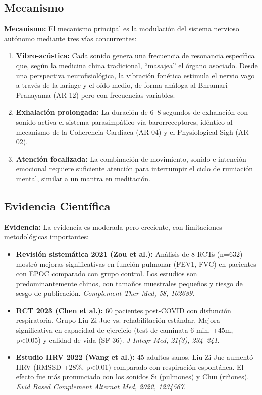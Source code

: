\documentclass[12pt,a4paper]{article}
\newcommand{\mecanismo}[1]{\textbf{Mecanismo:} #1}
\newcommand{\evidencia}[1]{\textbf{Evidencia:} #1}
\begin{document}
\subsection{Mecanismo}

\mecanismo{El mecanismo principal es la modulación del sistema nervioso
autónomo mediante tres vías concurrentes:}

\begin{enumerate}
    \item \textbf{Vibro-acústica:} Cada sonido genera una frecuencia
          de resonancia específica que, según la medicina china tradicional,
          ``masajea'' el órgano asociado. Desde una perspectiva neurofisiológica,
          la vibración fonética estimula el nervio vago a través de la
          laringe y el oído medio, de forma análoga al Bhramari Pranayama
          (AR-12) pero con frecuencias variables.
    \item \textbf{Exhalación prolongada:} La duración de 6--8 segundos de
          exhalación con sonido activa el sistema parasimpático vía
          barorreceptores, idéntico al mecanismo de la Coherencia Cardíaca
          (AR-04) y el Physiological Sigh (AR-02).
    \item \textbf{Atención focalizada:} La combinación de movimiento, sonido
          e intención emocional requiere suficiente atención para interrumpir
          el ciclo de rumiación mental, similar a un mantra en meditación.
\end{enumerate}

\subsection{Evidencia Científica}

\evidencia{La evidencia es moderada pero creciente, con limitaciones
metodológicas importantes:}

\begin{itemize}
    \item \textbf{Revisión sistemática 2021 (Zou et al.):}
          Análisis de 8 RCTs (n=632) mostró mejoras significativas en
          función pulmonar (FEV1, FVC) en pacientes con EPOC comparado con
          grupo control. Los estudios son predominantemente chinos, con
          tamaños muestrales pequeños y riesgo de sesgo de publicación.
          \textit{Complement Ther Med, 58, 102689}.
    \item \textbf{RCT 2023 (Chen et al.):}
          60 pacientes post-COVID con disfunción respiratoria. Grupo Liu Zi
          Jue vs. rehabilitación estándar. Mejora significativa en capacidad
          de ejercicio (test de caminata 6 min, +45m, p<0.05) y calidad de
          vida (SF-36). \textit{J Integr Med, 21(3), 234--241}.
    \item \textbf{Estudio HRV 2022 (Wang et al.):}
          45 adultos sanos. Liu Zi Jue aumentó HRV (RMSSD +28\%, p<0.01)
          comparado con respiración espontánea. El efecto fue más pronunciado
          con los sonidos Sī (pulmones) y Chuī (riñones).
          \textit{Evid Based Complement Alternat Med, 2022, 1234567}.
\end{itemize}
\end{document}
